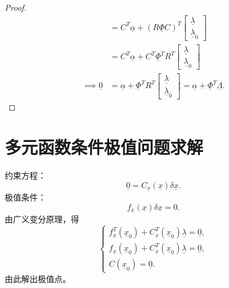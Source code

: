 \begin{proof}
\[\begin{aligned}
&= C^T \underline{\alpha} + (R \underline{\Phi} C)^T \begin{bmatrix}
\underline{\lambda} \\
\underline{\lambda}_0
\end{bmatrix} \\
&= C^T \underline{\alpha} + C^T \underline{\Phi}^T R^T \begin{bmatrix}
\underline{\lambda} \\
\underline{\lambda}_0
\end{bmatrix} \\
\implies \underline{0} &= \underline{\alpha} + \underline{\Phi}^T R^T \begin{bmatrix}
\underline{\lambda} \\
\underline{\lambda}_0
\end{bmatrix} = \underline{\alpha} + \underline{\Phi}^T \underline{\Lambda}.
\end{aligned}
\]
\end{proof}

\section{多元函数条件极值问题求解}
约束方程：
\[
\underline{0} = C_{\underline{x}}(\underline{x}) \delta \underline{x}.
\]
极值条件：
\[
f_{\underline{x}}(\underline{x}) \delta \underline{x} = 0.
\]
由广义变分原理，得
\[
\begin{cases}
f_{\underline{x}}^T(\underline{x}_0) + C_{\underline{x}}^T(\underline{x}_0) \underline{\lambda} = \underline{0}, \\
f_{\underline{x}}(\underline{x}_0) + C_{\underline{x}}^T(\underline{x}_0) \underline{\lambda} = \underline{0}, \\
C(\underline{x}_0) = \underline{0}.
\end{cases}
\]
由此解出极值点。